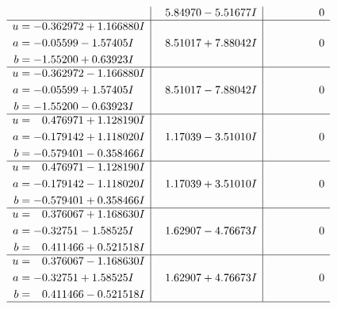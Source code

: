 \documentclass[1p]{elsarticle_modified}
\theoremstyle{definition}
\begin{document}
$$\begin{array}{c|c|c}
 & \phantom{-}5.84970 - 5.51677 I & \phantom{-0.000000 } 0 \\ \hline\begin{aligned}
u &= -0.362972 + 1.166880 I \\
a &= -0.05599 - 1.57405 I \\
b &= -1.55200 + 0.63923 I\end{aligned}
 & \phantom{-}8.51017 + 7.88042 I & \phantom{-0.000000 } 0 \\ \hline\begin{aligned}
u &= -0.362972 - 1.166880 I \\
a &= -0.05599 + 1.57405 I \\
b &= -1.55200 - 0.63923 I\end{aligned}
 & \phantom{-}8.51017 - 7.88042 I & \phantom{-0.000000 } 0 \\ \hline\begin{aligned}
u &= \phantom{-}0.476971 + 1.128190 I \\
a &= -0.179142 + 1.118020 I \\
b &= -0.579401 - 0.358466 I\end{aligned}
 & \phantom{-}1.17039 - 3.51010 I & \phantom{-0.000000 } 0 \\ \hline\begin{aligned}
u &= \phantom{-}0.476971 - 1.128190 I \\
a &= -0.179142 - 1.118020 I \\
b &= -0.579401 + 0.358466 I\end{aligned}
 & \phantom{-}1.17039 + 3.51010 I & \phantom{-0.000000 } 0 \\ \hline\begin{aligned}
u &= \phantom{-}0.376067 + 1.168630 I \\
a &= -0.32751 - 1.58525 I \\
b &= \phantom{-}0.411466 + 0.521518 I\end{aligned}
 & \phantom{-}1.62907 - 4.76673 I & \phantom{-0.000000 } 0 \\ \hline\begin{aligned}
u &= \phantom{-}0.376067 - 1.168630 I \\
a &= -0.32751 + 1.58525 I \\
b &= \phantom{-}0.411466 - 0.521518 I\end{aligned}
 & \phantom{-}1.62907 + 4.76673 I & \phantom{-0.000000 } 0\\
 \hline 
 \end{array}$$\newpage$$\begin{array}{c|c|c}  

\end{array}$$
\end{document}

